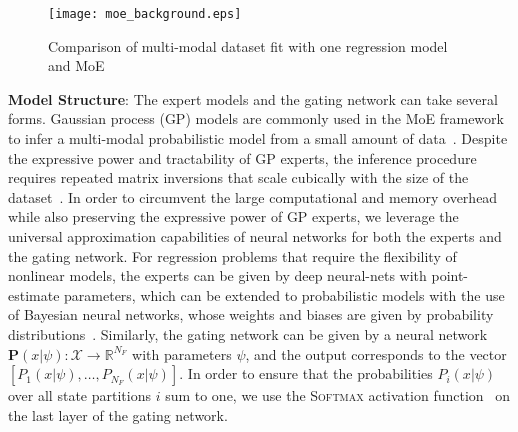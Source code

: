 \begin{figure}[tb]
  \centering
  \texttt{[image: moe\_background.eps]}
   \caption{Comparison of multi-modal dataset
  fit with one regression model and MoE }{\hspace{0.5\linewidth}}
  \label{fig:oldfaithful}
\end{figure}
%
\textbf{Model Structure}: The expert models and the gating network can take
several forms. 
%
Gaussian process (GP) models are commonly used in the MoE framework to infer a
multi-modal probabilistic model from a small amount of
data~\cite{harkonen2022mixtures}.
%
Despite the expressive power and tractability of GP experts, the inference
procedure requires repeated matrix inversions that scale cubically with the size
of the dataset~\cite{zhang2019embarrassingly}.  
%
%
In order to circumvent the large computational and memory overhead while also
preserving the expressive power of GP experts, we leverage the universal
approximation capabilities of neural networks for both the experts and the
gating network.
%
For regression problems that require the flexibility of nonlinear models, the
experts can be given by deep neural-nets with point-estimate parameters, which
can be extended to probabilistic models with the use of Bayesian neural
networks, whose weights and biases are given by probability
distributions~\cite{jospin2020hands}.
%
Similarly, the gating network can be given by a neural network $\mathbf{P}(x| \psi) :
\mathcal{X} \rightarrow \mathbb{R}^{N_F}$ with parameters $\psi$, and the output
corresponds to the vector $[P_1(x| \psi), \dots, P_{N_F}(x| \psi)]$.
%
In order to ensure that the probabilities $P_i(x | \psi)$ over all state
partitions $i$ sum to one, we use the \textsc{Softmax} activation
function~\cite{sharma2017activation} on the last layer of the gating network.
%


